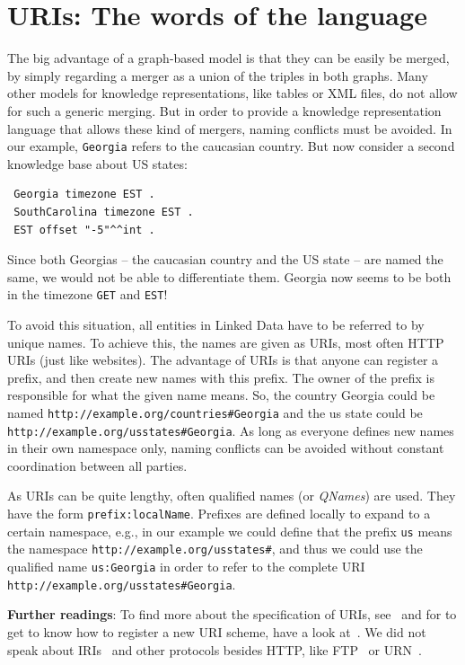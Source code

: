 \section{URIs: The words of the language}
\label{uri}

The big advantage of a graph-based model is that they can be easily be merged, by simply regarding a merger as a union of the triples in both graphs.
Many other models for knowledge representations, like tables or XML files, do not allow for such a generic merging.
But in order to provide a knowledge representation language that allows these kind of mergers, naming conflicts must be avoided.
In our example, \texttt{Georgia} refers to the caucasian country.
But now consider a second knowledge base about US states:

\begin{verbatim}
 Georgia timezone EST .
 SouthCarolina timezone EST .
 EST offset "-5"^^int .
\end{verbatim}

Since both Georgias -- the caucasian country and the US state -- are named the same, we would not be able to differentiate them.
Georgia now seems to be both in the timezone \texttt{GET} and \texttt{EST}!

To avoid this situation, all entities in Linked Data have to be referred to by unique names.
To achieve this, the names are given as URIs, most often HTTP URIs (just like websites).
The advantage of URIs is that anyone can register a prefix, and then create new names with this prefix.
The owner of the prefix is responsible for what the given name means.
So, the country Georgia could be named \texttt{http://example.org/countries\#Georgia} and the us state could be \texttt{http://example.org/usstates\#Georgia}.
As long as everyone defines new names in their own namespace only, naming conflicts can be avoided without constant coordination between all parties.

As URIs can be quite lengthy, often qualified names (or \textit{QNames}) are used.
They have the form \texttt{prefix:localName}.
Prefixes are defined locally to expand to a certain namespace, e.g., in our example we could define that the prefix \texttt{us} means the namespace \texttt{http://example.org/usstates\#}, and thus we could use the qualified name \texttt{us:Georgia} in order to refer to the complete URI \texttt{http://example.org/usstates\#Georgia}.

\medskip

\textbf{Further readings}:
To find more about the specification of URIs, see~\cite{uri} and for to get to know how to register a new URI scheme, have a look at~\cite{uri-registration}.
We did not speak about IRIs~\cite{iri} and other protocols besides HTTP, like FTP~\cite{ftp} or URN~\cite{urn}.

